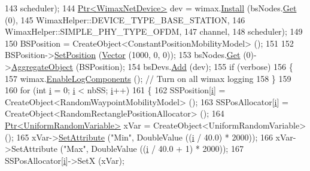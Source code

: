 \begin{DoxyCode}
143                           scheduler);
144   \hyperlink{classns3_1_1Ptr}{Ptr<WimaxNetDevice>} dev = wimax.\hyperlink{classns3_1_1WimaxHelper_a9f0848e09c4b6db9cdde9872b38f6349}{Install} (bsNodes.\hyperlink{classns3_1_1NodeContainer_a9ed96e2ecc22e0f5a3d4842eb9bf90bf}{Get} (0),
145                                            WimaxHelper::DEVICE\_TYPE\_BASE\_STATION,
146                                            WimaxHelper::SIMPLE\_PHY\_TYPE\_OFDM,
147                                            channel,
148                                            scheduler);
149 
150   BSPosition = CreateObject<ConstantPositionMobilityModel> ();
151 
152   BSPosition->\hyperlink{classns3_1_1MobilityModel_ac584b3d5a309709d2f13ed6ada1e7640}{SetPosition} (\hyperlink{classns3_1_1Vector3D_a7e59b47bc94c9cb1dadff68c1d0112d8}{Vector} (1000, 0, 0));
153   bsNodes.\hyperlink{classns3_1_1NodeContainer_a9ed96e2ecc22e0f5a3d4842eb9bf90bf}{Get} (0)->\hyperlink{classns3_1_1Object_a79dd435d300f3deca814553f561a2922}{AggregateObject} (BSPosition);
154   bsDevs.\hyperlink{classns3_1_1NetDeviceContainer_a7ca8bc1d7ec00fd4fcc63869987fbda5}{Add} (dev);
155   \textcolor{keywordflow}{if} (verbose)
156     \{
157       wimax.\hyperlink{classns3_1_1WimaxHelper_a31da3d96f3aa8d48749625ee8e148af7}{EnableLogComponents} ();  \textcolor{comment}{// Turn on all wimax logging}
158     \}
159 
160   \textcolor{keywordflow}{for} (\textcolor{keywordtype}{int} \hyperlink{bernuolliDistribution_8m_a6f6ccfcf58b31cb6412107d9d5281426}{i} = 0; \hyperlink{bernuolliDistribution_8m_a6f6ccfcf58b31cb6412107d9d5281426}{i} < nbSS; \hyperlink{bernuolliDistribution_8m_a6f6ccfcf58b31cb6412107d9d5281426}{i}++)
161     \{
162       SSPosition[\hyperlink{bernuolliDistribution_8m_a6f6ccfcf58b31cb6412107d9d5281426}{i}] = CreateObject<RandomWaypointMobilityModel> ();
163       SSPosAllocator[\hyperlink{bernuolliDistribution_8m_a6f6ccfcf58b31cb6412107d9d5281426}{i}] = CreateObject<RandomRectanglePositionAllocator> ();
164       \hyperlink{classns3_1_1Ptr}{Ptr<UniformRandomVariable>} xVar = CreateObject<UniformRandomVariable> ();
165       xVar->\hyperlink{classns3_1_1ObjectBase_ac60245d3ea4123bbc9b1d391f1f6592f}{SetAttribute} (\textcolor{stringliteral}{"Min"}, DoubleValue ((\hyperlink{bernuolliDistribution_8m_a6f6ccfcf58b31cb6412107d9d5281426}{i} / 40.0) * 2000));
166       xVar->SetAttribute (\textcolor{stringliteral}{"Max"}, DoubleValue ((\hyperlink{bernuolliDistribution_8m_a6f6ccfcf58b31cb6412107d9d5281426}{i} / 40.0 + 1) * 2000));
167       SSPosAllocator[\hyperlink{bernuolliDistribution_8m_a6f6ccfcf58b31cb6412107d9d5281426}{i}]->SetX (xVar);

\end{DoxyCode}
